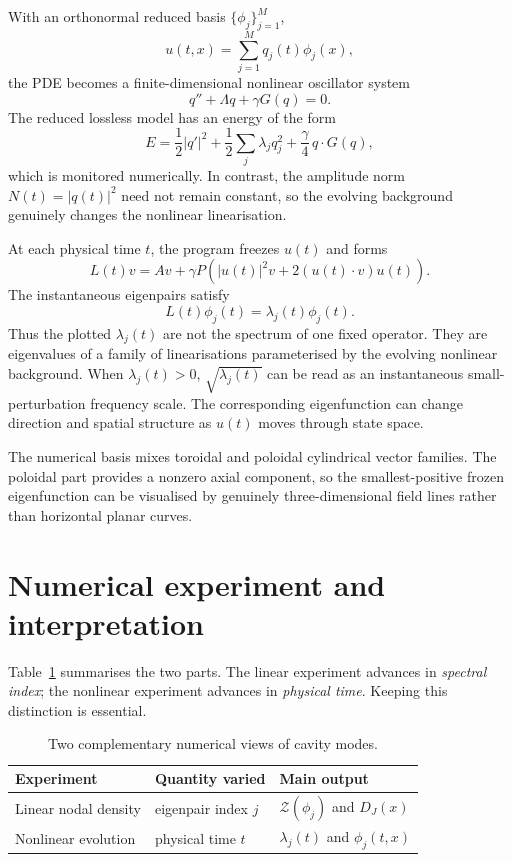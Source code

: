 \documentclass[10pt]{article}
\begin{document}
With an orthonormal reduced basis $\{\phi_j\}_{j=1}^M$,
\[
u(t,x)=\sum_{j=1}^M q_j(t)\phi_j(x),
\]
the PDE becomes a finite-dimensional nonlinear oscillator system
\begin{equation}
q''+\Lambda q+\gamma G(q)=0.
\end{equation}
The reduced lossless model has an energy of the form
\begin{equation}
E=\frac12|q'|^2+\frac12\sum_j\lambda_j q_j^2
+\frac{\gamma}{4}\,q\cdot G(q),
\end{equation}
which is monitored numerically.  In contrast, the amplitude norm $N(t)=|q(t)|^2$ need not remain constant, so the evolving background genuinely changes the nonlinear linearisation.

At each physical time $t$, the program freezes $u(t)$ and forms
\begin{equation}
L(t)v=Av+\gamma P\left(|u(t)|^2v+2(u(t)\cdot v)u(t)\right).
\end{equation}
The instantaneous eigenpairs satisfy
\begin{equation}
L(t)\phi_j(t)=\lambda_j(t)\phi_j(t).
\end{equation}
Thus the plotted $\lambda_j(t)$ are not the spectrum of one fixed operator.  They are eigenvalues of a family of linearisations parameterised by the evolving nonlinear background.  When $\lambda_j(t)>0$, $\sqrt{\lambda_j(t)}$ can be read as an instantaneous small-perturbation frequency scale.  The corresponding eigenfunction can change direction and spatial structure as $u(t)$ moves through state space.

The numerical basis mixes toroidal and poloidal cylindrical vector families.  The poloidal part provides a nonzero axial component, so the smallest-positive frozen eigenfunction can be visualised by genuinely three-dimensional field lines rather than horizontal planar curves.

\section{Numerical experiment and interpretation}
Table~\ref{tab:exp} summarises the two parts.  The linear experiment advances in \emph{spectral index}; the nonlinear experiment advances in \emph{physical time}.  Keeping this distinction is essential.

\begin{table}[h]
\centering
\small
\begin{tabular}{@{}lll@{}}
\toprule
Experiment & Quantity varied & Main output \\
\midrule
Linear nodal density & eigenpair index $j$ & $\mathcal Z(\phi_j)$ and $D_J(x)$ \\
Nonlinear evolution & physical time $t$ & $\lambda_j(t)$ and $\phi_j(t,x)$ \\
\bottomrule
\end{tabular}
\caption{Two complementary numerical views of cavity modes.}
\label{tab:exp}
\end{table}
\end{document}
